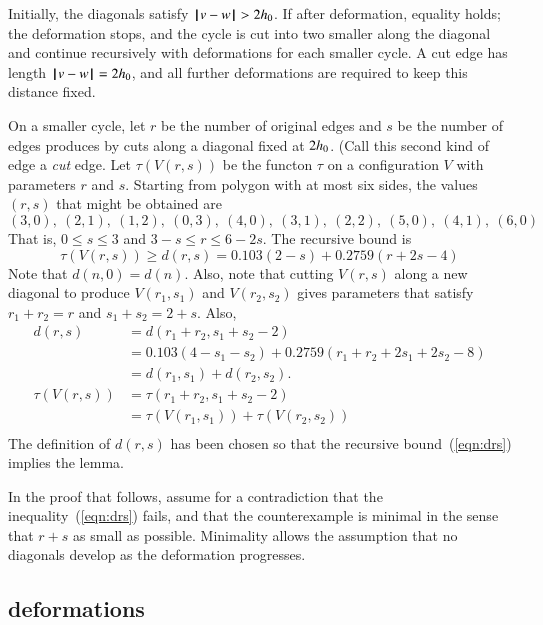 Initially, the diagonals satisfy ${\hskip0.1em|\hskip-0.15em|\hskip0.1em}v - w{\hskip0.1em|\hskip-0.15em|\hskip0.1em}>2{h_0}$.
If after deformation, equality holds;  the deformation stops, and the cycle is cut into two smaller along the diagonal
and continue recursively with deformations for each smaller cycle.  A cut edge has length ${\hskip0.1em|\hskip-0.15em|\hskip0.1em}v - w{\hskip0.1em|\hskip-0.15em|\hskip0.1em}=2{h_0}$, and
 all further deformations are required to keep this distance fixed.  

On a smaller cycle, let $r$ be the number of original edges and $s$ be the number of edges produces by cuts along a diagonal fixed at $2{h_0}$.  (Call this second kind of edge a {\it cut} edge.  Let $\tau(V(r,s))$ be the functon $\tau$ on a configuration $V$ with parameters $r$ and $s$.  Starting from polygon with at most six sides, the values $(r,s)$ that might be obtained are
$$
(3,0),~(2,1),~(1,2),~(0,3),~
(4,0),~(3,1),~(2,2),~
(5,0),~(4,1),~
(6,0)
$$
That is, $0\le s\le 3$ and $3-s\le r\le 6-2s$.
The recursive bound is
\begin{equation}\label{eqn:drs}
\tau(V(r,s)) \ge d(r,s) = 0.103 (2-s) + 0.2759 (r+2s-4) 
\end{equation}
Note that $d(n,0) = d(n)$. Also, note that cutting
$V(r,s)$ along a new diagonal to produce $V(r_1,s_1)$
and $V(r_2,s_2)$ gives parameters that satisfy $r_1+r_2=r$ and $s_1+s_2 = 2+s$.
Also,
\begin{equation}\label{eqn:drs-add}
\begin{array}{lll}
d(r,s) &= d(r_1+r_2,s_1+s_2-2) \\
  &=0.103 (4-s_1-s_2) + 0.2759 (r_1+r_2+2s_1+2s_2-8) \\
  &=d(r_1,s_1) + d(r_2,s_2).\\
\tau(V(r,s)) &= \tau(r_1+r_2,s_1+s_2-2)\\
  &=\tau(V(r_1,s_1)) +\tau(V(r_2,s_2))\\
\end{array}
\end{equation}
The definition of $d(r,s)$ has been
chosen so that the recursive 
bound~(\ref{eqn:drs}) implies the
lemma.

In the proof that follows,  assume for a contradiction that the
inequality~(\ref{eqn:drs}) fails, and that the counterexample is minimal in the sense that $r+s$ as small as possible.   Minimality allows the assumption that no diagonals develop as the deformation progresses.

\subsection{deformations}

